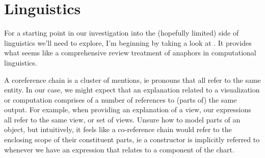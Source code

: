 \section{Linguistics}
For a starting point in our investigation into the (hopefully limited) side of linguistics we'll need to explore, I'm 
beginning by taking a look at \citet{poesio23}. It provides what seems like a comprehensive review treatment of anaphors
in computational linguistics. 

A coreference chain is a cluster of mentions, ie pronouns that all refer to the same entity. In our case, we might
expect that an explanation related to a visualization or computation comprises of a number of references to (parts of)
the same output. For example, when providing an explanation of a view, our expressions all refer to the same view, or
set of views. Unsure how to model parts of an object, but intuitively, it feels like a co-reference chain would
refer to the enclosing scope of their constituent parts, ie a  constructor is implicitly referred to
whenever we have an expression that relates to a component of the chart.